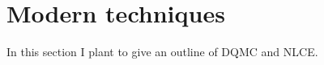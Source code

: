 \documentclass[oneside,11pt]{memoir}
\newcommand{\dbl}{\ensuremath{ \uparrow\! \downarrow \, }}
\newcommand{\spup}{\ensuremath{ \uparrow }}
\newcommand{\spdn}{\ensuremath{ \downarrow}}
\begin{document}
\section{ Modern techniques }
In this section I plant to give an outline of DQMC and NLCE. 
\end{document}
